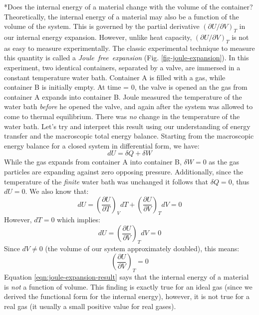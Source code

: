 \documentclass[11pt]{article}
\makeatletter
\theoremstyle{definition}
\renewcommand\subsection{\@startsection
	{subsection}{2}{0mm}
	{-0.05in}
	{0.5\baselineskip}
	{\normalfont\normalsize\bfseries}}
\makeatother
\begin{document}
\subsection*{Does the internal energy of a material change with the volume of the container?}
Theoretically, the internal energy of a material may also be a function of the volume of the system.
This is governed by the partial derivative $\left(\partial{U}/\partial{V}\right)_{T}$ in
our internal energy expansion. However, unlike heat capacity, $\left(\partial{U}/\partial{V}\right)_{T}$ is not as easy to measure experimentally.
The classic experimental technique to measure this quantity is called a \textit{Joule~free~expansion} (Fig. \ref{fig-joule-expansion}).
In this experiment, two identical containers, separated by a valve, are immersed in a constant temperature water bath.
Container A is filled with a gas, while container B is initially empty. At time = 0, the valve is opened an the gas from container A expands into container B.
Joule measured the temperature of the water bath \textit{before} he opened the valve, and again after the system was allowed to come to thermal equilibrium.
There was \textit{no} change in the temperature of the water bath. Let's try and interpret this result using our understanding of energy transfer and the macroscopic total
energy balance. Starting from the macroscopic energy balance for a closed system in differential form, we have:
\begin{equation}
	dU = \delta{Q} + \delta{W}
\end{equation}While the gas expands from container A into container B, $\delta{W} = 0$ as the gas particles are expanding against zero opposing pressure.
Additionally, since the temperature of the \textit{finite} water bath was unchanged it follows that $\delta{Q} = 0$, thus $dU = 0$.
We also know that:
\begin{equation}
	dU = \left(\frac{\partial{U}}{\partial{T}}\right)_{V}dT + \left(\frac{\partial{U}}{\partial{V}}\right)_{T}dV = 0
\end{equation}However, $dT = 0$ which implies:
\begin{equation}
	dU = \left(\frac{\partial{U}}{\partial{V}}\right)_{T}dV = 0
\end{equation}Since $dV\neq{0}$ (the volume of our system approximately doubled), this means:
\begin{equation}\label{eqn:joule-expansion-result}
	\left(\frac{\partial{U}}{\partial{V}}\right)_{T} = 0
\end{equation}Equation \eqref{eqn:joule-expansion-result} says that the internal energy of a material is \textit{not} a function of volume. This finding is exactly true for an
ideal gas (since we derived the functional form for the internal energy), however, it is not true for a real gas (it usually a small positive value for real gases).
\end{document}
